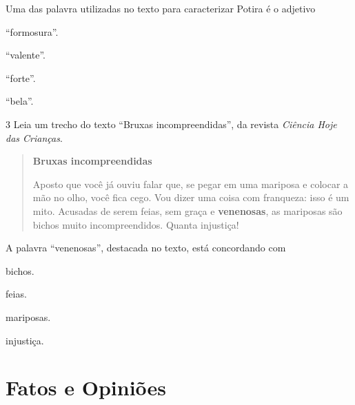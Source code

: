 Uma das palavra utilizadas no texto para caracterizar Potira é o adjetivo

\begin{escolha}
\item ``formosura''.

\item ``valente''.

\item ``forte''.

\item ``bela''.
\end{escolha}

\num{3} Leia um trecho do texto ``Bruxas incompreendidas'',
da revista \textit{Ciência Hoje das Crianças}.

\begin{quote}
\textbf{Bruxas incompreendidas}

Aposto que você já ouviu falar que, se pegar em uma mariposa e colocar a
mão no olho, você fica cego. Vou dizer uma coisa com franqueza: isso é
um mito. Acusadas de serem feias, sem graça e \textbf{venenosas}, as
mariposas são bichos muito incompreendidos. Quanta injustiça!
\end{quote}


A palavra ``venenosas'', destacada no texto, está concordando com

\begin{escolha}
\item bichos.

\item feias.

\item mariposas.

\item injustiça.
\end{escolha}

\chapter{Fatos e Opiniões}


